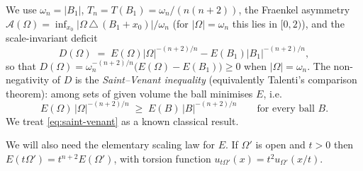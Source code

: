 \documentclass[11pt]{amsart}
\theoremstyle{definition}
\newcommand{\Om}{\Omega}
\newcommand{\Fr}{\mathcal A}
\newcommand{\abs}[1]{\left|#1\right|}
\begin{document}
We use $\omega_n=\abs{B_1}$, $T_n=T(B_1)=\omega_n/(n(n+2))$, the Fraenkel
asymmetry $\Fr(\Om)=\inf_{x_0}\abs{\Om\,\triangle\,(B_1+x_0)}/\omega_n$
(for $\abs{\Om}=\omega_n$ this lies in $[0,2)$), and the scale-invariant
deficit
\begin{equation}\label{eq:deficit-def}
   D(\Om)\;=\;E(\Om)\abs{\Om}^{-(n+2)/n}-E(B_1)\abs{B_1}^{-(n+2)/n},
\end{equation}
so that $D(\Om)=\omega_n^{-(n+2)/n}\bigl(E(\Om)-E(B_1)\bigr)\ge0$ when
$\abs{\Om}=\omega_n$.
The non-negativity of $D$ is the
\emph{Saint--Venant inequality} (equivalently Talenti's comparison
theorem): among sets of given volume the ball minimises $E$, i.e.
\begin{equation}\label{eq:saint-venant}
   E(\Om)\,\abs{\Om}^{-(n+2)/n}\;\ge\;E(B)\,\abs{B}^{-(n+2)/n}
   \qquad\text{for every ball }B.
\end{equation}
We treat \eqref{eq:saint-venant} as a known classical result.

We will also need the elementary scaling law for $E$. If $\Om'$ is open
and $t>0$ then $E(t\Om')=t^{n+2}E(\Om')$, with torsion function
$u_{t\Om'}(x)=t^2u_{\Om'}(x/t)$.
\end{document}
